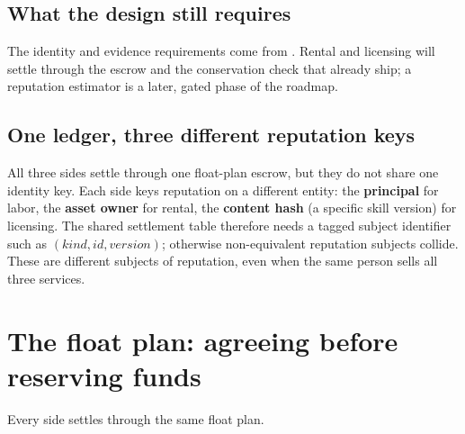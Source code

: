 \documentclass[11pt,a4paper]{article}
\theoremstyle{definition}
\theoremstyle{definition}
\theoremstyle{remark}
\begin{document}
\subsection{What the design still requires}

The identity and evidence requirements come from
.
Rental and licensing will settle through the escrow and the conservation
check that already ship; a reputation estimator is a later, gated phase of the
roadmap.

\subsection*{One ledger, three different reputation keys}

All three sides settle through one float-plan escrow, but they do not share one identity key.
Each side keys reputation on a different entity: the \textbf{principal} for
labor, the \textbf{asset owner} for rental, the \textbf{content hash} (a specific
skill version) for licensing. The shared settlement table therefore needs a tagged
subject identifier such as $(\mathit{kind},\mathit{id},\mathit{version})$; otherwise
non-equivalent reputation subjects collide. These are different subjects of
reputation, even when the same person sells all three services.

\pdexercisepointer{\ref{ex:he-sides-test-rideshare}}{\ref{ex:he-reputation-disclosure}}{\pageref{ex:he-sides-test-rideshare}}

\section{The float plan: agreeing before reserving funds}\label{sec:float-plan}

%
Every side settles through the same float plan.
\end{document}
